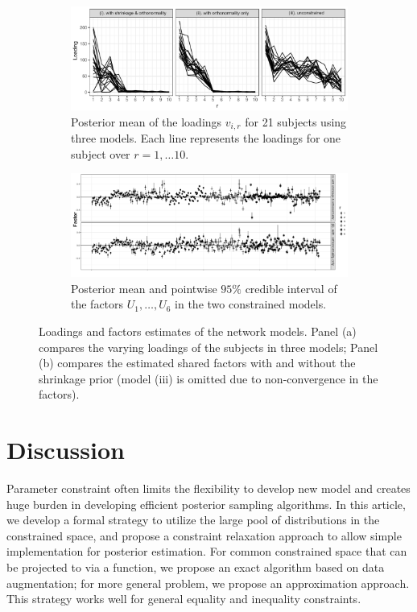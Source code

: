 \documentclass[10pt,fleqn]{article} \pdfoutput=1
\DeclareMathOperator{\1}{\mathbbm{1}} \DeclareMathOperator{\bigO}{\mc O}
\begin{document}
\begin{figure}[H] \centering \begin{subfigure}[b]{0.8\textwidth}
		\includegraphics[width=1\textwidth]{network_loading}
		\caption{Posterior mean of the loadings $v_{i,r}$ for 21 subjects
			using three models. Each line represents the loadings for one
			subject over $r=1,\ldots10$.} \end{subfigure}
	\begin{subfigure}[b]{1\textwidth}
		\includegraphics[width=1\textwidth]{network_factor.pdf}
		\caption{Posterior mean and pointwise $95\%$ credible interval of
			the factors $U_1,\ldots, U_6$ in the two constrained
			models. } \end{subfigure} \caption{Loadings and factors estimates
		of the network models. Panel (a) compares the varying loadings of
		the subjects in three models; Panel (b) compares the estimated
		shared factors with and without the shrinkage prior (model (iii) is
		omitted due to non-convergence in the factors).
		\label{network_model_basis}} \end{figure}




\section{Discussion}

Parameter constraint often limits the flexibility to develop new model and
creates huge burden in developing efficient posterior sampling algorithms.
In this article, we develop a formal strategy to utilize the large pool of
distributions in the constrained space, and propose a constraint relaxation
approach to allow simple implementation for posterior estimation. For
common constrained space that can be projected to via a function, we
propose an exact algorithm based on data augmentation; for more general
problem, we propose an approximation approach.  This strategy works well
for general equality and inequality constraints.
\end{document}

